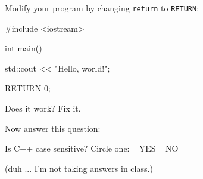 Modify your program by changing \verb!return! to \verb!RETURN!:
\begin{console}
#include <iostream>

int main()
{
    std::cout << "Hello, world!\n";

    RETURN 0;
}
\end{console}
Does it work? Fix it.

Now answer this question:

Is C++ case sensitive? Circle one: \,\,\, YES  \,\,\, NO

(duh ... I'm not taking answers in class.)

